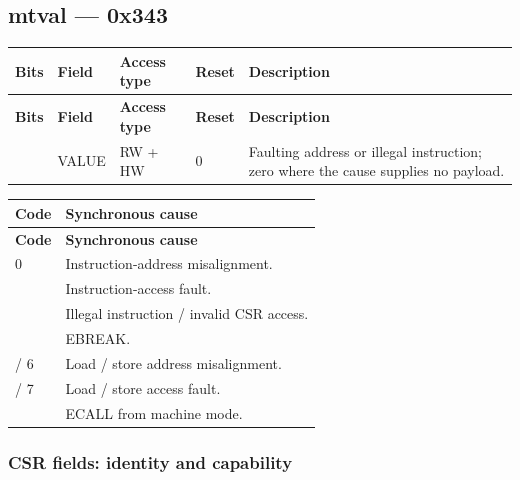 \documentclass[11pt]{article}
\begin{document}
\subsection*{mtval — 0x343}
{\small
\begin{longtable}{@{}L{0.1200\dimexpr\linewidth-48pt\relax}L{0.1800\dimexpr\linewidth-48pt\relax}L{0.1200\dimexpr\linewidth-48pt\relax}L{0.1200\dimexpr\linewidth-48pt\relax}L{0.4600\dimexpr\linewidth-48pt\relax}@{}}
\toprule
\textbf{Bits} & \textbf{Field} & \textbf{Access type} & \textbf{Reset} & \textbf{Description} \\ \midrule
\endfirsthead
\toprule
\textbf{Bits} & \textbf{Field} & \textbf{Access type} & \textbf{Reset} & \textbf{Description} \\ \midrule
\endhead
[31:0] & VALUE & RW + HW & 0 & Faulting address or illegal instruction; zero where the cause supplies no payload. \\*
\bottomrule\end{longtable}}
{\small
\begin{longtable}{@{}L{0.2000\dimexpr\linewidth-12pt\relax}L{0.8000\dimexpr\linewidth-12pt\relax}@{}}
\toprule
\textbf{Code} & \textbf{Synchronous cause} \\ \midrule
\endfirsthead
\toprule
\textbf{Code} & \textbf{Synchronous cause} \\ \midrule
{} & Instruction-address misalignment. \\  & Instruction-access fault. \\  & Illegal instruction / invalid CSR access. \\  & EBREAK. \\  / 6 & Load / store address misalignment. \\  / 7 & Load / store access fault. \\  & ECALL from machine mode. \\*
\bottomrule\end{longtable}}

\subsubsection{CSR fields: identity and capability}
\end{document}
